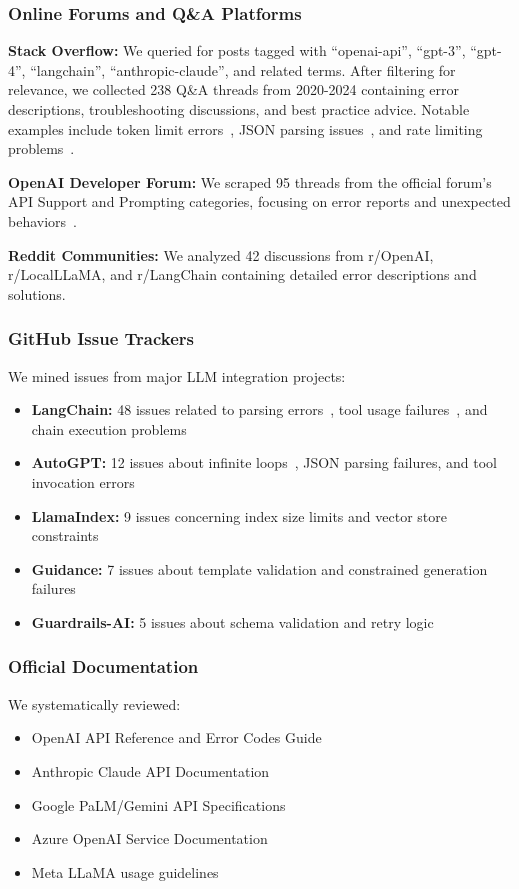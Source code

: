 \documentclass[11pt]{article}
\begin{document}
\subsubsection{Online Forums and Q\&A Platforms}
\textbf{Stack Overflow:} We queried for posts tagged with ``openai-api'', ``gpt-3'', ``gpt-4'', ``langchain'', ``anthropic-claude'', and related terms. After filtering for relevance, we collected 238 Q\&A threads from 2020-2024 containing error descriptions, troubleshooting discussions, and best practice advice. Notable examples include token limit errors~\cite{stackoverflow75396481}, JSON parsing issues~\cite{stackoverflow77606776}, and rate limiting problems~\cite{stackoverflow75898276}.

\textbf{OpenAI Developer Forum:} We scraped 95 threads from the official forum's API Support and Prompting categories, focusing on error reports and unexpected behaviors~\cite{openai2023forum}.

\textbf{Reddit Communities:} We analyzed 42 discussions from r/OpenAI, r/LocalLLaMA, and r/LangChain containing detailed error descriptions and solutions.

\subsubsection{GitHub Issue Trackers}
We mined issues from major LLM integration projects:
\begin{itemize}
    \item \textbf{LangChain:} 48 issues related to parsing errors~\cite{githublangchain22103}, tool usage failures~\cite{githublangchain18279}, and chain execution problems
    \item \textbf{AutoGPT:} 12 issues about infinite loops~\cite{githubautogpt1994}, JSON parsing failures, and tool invocation errors
    \item \textbf{LlamaIndex:} 9 issues concerning index size limits and vector store constraints~\cite{githubllamaindex13278}
    \item \textbf{Guidance:} 7 issues about template validation and constrained generation failures
    \item \textbf{Guardrails-AI:} 5 issues about schema validation and retry logic
\end{itemize}

\subsubsection{Official Documentation}
We systematically reviewed:
\begin{itemize}
    \item OpenAI API Reference and Error Codes Guide~\cite{openai2023docs}
    \item Anthropic Claude API Documentation~\cite{anthropic2023docs}
    \item Google PaLM/Gemini API Specifications~\cite{google2023gemini}
    \item Azure OpenAI Service Documentation~\cite{azureopenai2023}
    \item Meta LLaMA usage guidelines~\cite{meta2023llama}
\end{itemize}
\end{document}
